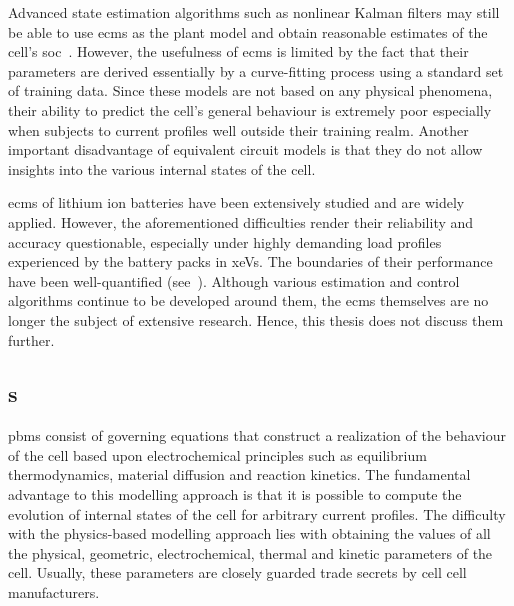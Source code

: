 Advanced state estimation algorithms such  as nonlinear Kalman filters may still
be able to use \glspl{ecm} as the plant model and obtain reasonable estimates of
the  cell's  \gls{soc}~\cite{Plett2006,  Sun2011}. However,  the  usefulness  of
\glspl{ecm} is limited by the fact that their parameters are derived essentially
by a  curve-fitting process using a  standard set of training  data. Since these
models are  not based on  any physical phenomena,  their ability to  predict the
cell's general behaviour  is extremely poor especially when  subjects to current
profiles well  outside their training  realm. Another important  disadvantage of
equivalent circuit  models is that they  do not allow insights  into the various
internal states of the cell.

\glspl{ecm}  of  lithium  ion  batteries   have  been  extensively  studied  and
are  widely  applied.  However,  the aforementioned  difficulties  render  their
reliability and  accuracy questionable,  especially under highly  demanding load
profiles  experienced by  the battery  packs in  \glspl{xeV}. The  boundaries of
their  performance have  been well-quantified  (see~\cite{Plett2015,Plett2016}).
Although  various estimation  and control  algorithms continue  to be  developed
around them, the  \glspl{ecm} themselves are no longer the  subject of extensive
research. Hence, this thesis does not discuss them further.

\subsection{s}\label{subsec:pbms}


\glspl{pbm} consist of  governing equations that construct a  realization of the
behaviour of the cell based  upon electrochemical principles such as equilibrium
thermodynamics,  material  diffusion  and  reaction  kinetics.  The  fundamental
advantage  to this  modelling approach  is that  it is  possible to  compute the
evolution of  internal states of  the cell  for arbitrary current  profiles. The
difficulty with  the physics-based  modelling approach  lies with  obtaining the
values  of all  the physical,  geometric, electrochemical,  thermal and  kinetic
parameters  of the  cell. Usually,  these parameters  are closely  guarded trade
secrets by cell cell manufacturers.

